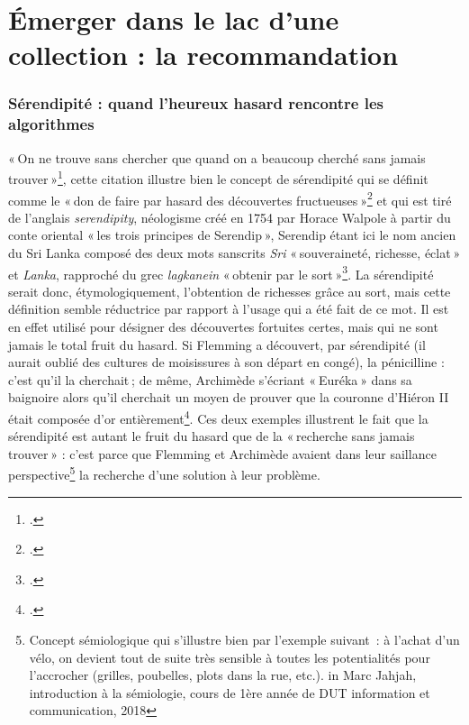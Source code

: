 \chapter{Émerger dans le lac d'une collection : la recommandation}

\subsection{Sérendipité : quand l'heureux hasard rencontre les algorithmes}

« On ne trouve sans chercher que quand on a beaucoup cherché sans jamais trouver »\footcite{2015}, cette citation illustre bien le concept de sérendipité qui se définit comme le « don de faire par hasard des découvertes fructueuses »\footcite{zotero-224} et qui est tiré de l’anglais \textit{serendipity}, néologisme créé en 1754 par Horace Walpole à partir du conte oriental « les trois principes de Serendip », Serendip étant ici le nom ancien du Sri Lanka composé des deux mots sanscrits \textit{Sri} « souveraineté, richesse, éclat » et \textit{Lanka}, rapproché du grec \textit{lagkanein} « obtenir par le sort »\footcite{zotero-224}. La sérendipité serait donc, étymologiquement, l’obtention de richesses grâce au sort, mais cette définition semble réductrice par rapport à l’usage qui a été fait de ce mot. Il est en effet utilisé pour désigner des découvertes fortuites certes, mais qui ne sont jamais le total fruit du hasard. Si Flemming a découvert, par sérendipité (il aurait oublié des cultures de moisissures à son départ en congé), la pénicilline : c’est qu’il la cherchait ; de même, Archimède s’écriant « Euréka » dans sa baignoire alors qu’il cherchait un moyen de prouver que la couronne d’Hiéron II était composée d’or entièrement\footcite[Annexe 1]{michel2019}. Ces deux exemples illustrent le fait que la sérendipité est autant le fruit du hasard que de la « recherche sans jamais trouver » : c’est parce que Flemming et Archimède avaient dans leur saillance perspective\footnote{Concept sémiologique qui s’illustre bien par l’exemple suivant : à l’achat d’un vélo, on devient tout de suite très sensible à toutes les potentialités pour l’accrocher (grilles, poubelles, plots dans la rue, etc.). in Marc Jahjah, introduction à la sémiologie, cours de 1ère année de DUT information et communication, 2018 } la recherche d’une solution à leur problème.

